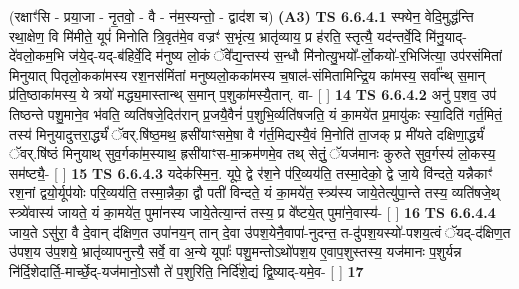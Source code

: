 \documentclass[17pt]{extarticle}
\begin{document}
                  \newline
                      (रक्षाꣳ॑सि - प्रया॒जा - नृ॒तवो॒ - वै - न॑म॒स्यन्तो॒ - द्वाद॑श च)  \textbf{(A3)} \newline \newline
                                        \textbf{ TS 6.6.4.1} \newline
                  स्फ्येन॒ वेदि॒मुद्ध॑न्ति रथा॒क्षेण॒ वि मि॑मीते॒ यूपं॑ मिनोति त्रि॒वृत॑मे॒व वज्रꣳ॑ स॒भृंत्य॒ भ्रातृ॑व्याय॒ प्र ह॑रति॒ स्तृत्यै॒ यद॑न्तर्वे॒दि मि॑नु॒याद्-दे॑वलो॒कम॒भि ज॑ये॒द्-यद्-ब॑हिर्वे॒दि म॑नुष्य लो॒कं ॅवे᳚द्य॒न्तस्य॑ स॒न्धौ मि॑नोत्यु॒भयो᳚-र्लो॒कयो॑-र॒भिजि॑त्या॒ उप॑रसंमितां मिनुयात् पितृलो॒कका॑मस्य रश॒नस॑मिंतां मनुष्यलो॒कका॑मस्य च॒षाल॑-संमितामिन्द्रि॒य का॑मस्य॒ सर्वा᳚न्थ् स॒मान् प्र॑ति॒ष्ठाका॑मस्य॒ ये त्रयो॑ मद्ध्य॒मास्तान्थ् स॒मान् प॒शुका॑मस्यै॒तान्. वा- [  ] \textbf{  14} \newline
                  \newline
                                \textbf{ TS 6.6.4.2} \newline
                  अनु॑ प॒शव॒ उप॑ तिष्ठन्ते पशु॒माने॒व भ॑वति॒ व्यति॑षजे॒दित॑रान् प्र॒जयै॒वैनं॑ प॒शुभि॒र्व्यति॑षजति॒ यं का॒मये॑त प्र॒मायु॑कः स्या॒दिति॑ गर्त॒मितं॒ तस्य॑ मिनुयादुत्तरा॒र्द्ध्यं॑ ॅवर्.षि॑ष्ठ॒मथ॒ ह्रसी॑याꣳसमे॒षा वै ग॑र्त॒मिद्यस्यै॒वं मि॒नोति॑ ता॒जक् प्र मी॑यते दक्षिणा॒र्द्ध्यं॑ ॅवर्.षि॑ष्ठं मिनुयाथ् सुव॒र्गका॑म॒स्याथ॒ ह्रसी॑याꣳस-मा॒क्रम॑णमे॒व तथ् सेतुं॒ ॅयज॑मानः कुरुते सुव॒र्गस्य॑ लो॒कस्य॒ सम॑ष्ट्यै॒- [  ] \textbf{  15} \newline
                  \newline
                                \textbf{ TS 6.6.4.3} \newline
                  यदेक॑स्मि॒न॒. यूपे॒ द्वे र॑श॒ने प॑रि॒व्यय॑ति॒ तस्मा॒देको॒ द्वे जा॒ये वि॑न्दते॒ यन्नैकाꣳ॑ रश॒नां द्वयो॒र्यूप॑योः परि॒व्यय॑ति॒ तस्मा॒न्नैका॒ द्वौ पती॑ विन्दते॒ यं का॒मये॑त॒ स्त्र्य॑स्य जाये॒तेत्यु॑पा॒न्ते तस्य॒ व्यति॑षजे॒थ् स्त्र्ये॑वास्य॑ जायते॒ यं का॒मये॑त॒ पुमा॑नस्य जाये॒तेत्या॒न्तं तस्य॒ प्र वे᳚ष्टये॒त् पुमा॑ने॒वास्य॑- [  ] \textbf{  16} \newline
                  \newline
                                \textbf{ TS 6.6.4.4} \newline
                  जाय॒ते ऽसु॑रा॒ वै दे॒वान् द॑क्षिण॒त उपा॑नय॒न् तान् दे॒वा उ॑पश॒येनै॒वापा॑-नुदन्त॒ त-दु॑पश॒यस्यो॑-पशय॒त्वं ॅयद्-द॑क्षिण॒त उ॑पश॒य उ॑प॒शये॒ भ्रातृ॑व्यापनुत्त्यै॒ सर्वे॒ वा अ॒न्ये यूपाः᳚ पशु॒मन्तोऽथो॑पश॒य ए॒वाप॒शुस्तस्य॒ यज॑मानः प॒शुर्यन्न नि॑र्दि॒शेदार्ति॒-मार्च्छे॒द्-यज॑मानो॒ऽसौ ते॑ प॒शुरिति॒ निर्दि॑शे॒द्यं द्वि॒ष्याद्-यमे॒व- [  ] \textbf{  17} \newline
\end{document}
